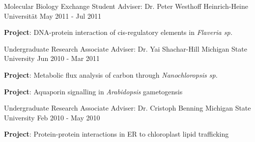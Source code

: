 \begin{cventries}
  \cventry
    {Molecular Biology Exchange Student} %
    {Adviser: Dr. Peter Westhoff} %
    {Heinrich-Heine Universit{\"a}t} %
    {May 2011 - Jul 2011} %
    {
      \begin{cvitems} %
        \item {\textbf{Project}: DNA-protein interaction of cis-regulatory elements in {\it Flaveria sp.}}
      \end{cvitems}
    }
    
  \cventry
    {Undergraduate Research Associate} %
    {Adviser: Dr. Yai Shachar-Hill} %
    {Michigan State University} %
    {Jun 2010 - Mar 2011} %
    {
      \begin{cvitems} %
        \item {\textbf{Project}: Metabolic flux analysis of carbon through {\it Nanochloropsis sp.}}
        \item {\textbf{Project}: Aquaporin signalling in {\it Arabidopsis} gametogensis}
      \end{cvitems}
    }

  \cventry
    {Undergraduate Research Associate} %
    {Adviser: Dr. Cristoph Benning} %
    {Michigan State University} %
    {Feb 2010 - May 2010} %
    {
      \begin{cvitems} %
        \item {\textbf{Project}: Protein-protein interactions in ER to chloroplast lipid trafficking}
      \end{cvitems}
    }
    
\vspace{-4.0mm}
\end{cventries}
